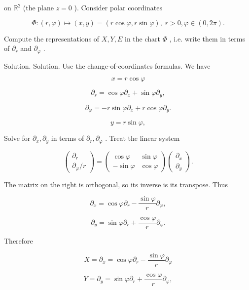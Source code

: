 \documentclass[10pt]{article}
\begin{document}
on \({\mathbb{R}}^{2}\) (the plane \(z = 0\) ). Consider polar coordinates

\[
\Phi  : \left( {r,\varphi }\right)  \mapsto  \left( {x,y}\right)  = \left( {r\cos \varphi ,r\sin \varphi }\right) ,\;r > 0,\varphi  \in  \left( {0,{2\pi }}\right) .
\]

Compute the representations of \(X,Y,E\) in the chart \(\Phi\) , i.e. write them in terms of \({\partial }_{r}\) and \({\partial }_{\varphi }\) .

Solution. Solution. Use the change-of-coordinates formulas. We have

\[
x = r\cos \varphi
\]

\[
{\partial }_{r} = \cos \varphi {\partial }_{x} + \sin \varphi {\partial }_{y},
\]

\[
{\partial }_{\varphi } =  - r\sin \varphi {\partial }_{x} + r\cos \varphi {\partial }_{y}.
\]

\[
y = r\sin \varphi ,
\]

Solve for \({\partial }_{x},{\partial }_{y}\) in terms of \({\partial }_{r},{\partial }_{\varphi }\) . Treat the linear system

\[
\left( \begin{matrix} {\partial }_{r} \\  {\partial }_{\varphi }/r \end{matrix}\right)  = \left( \begin{matrix} \cos \varphi & \sin \varphi \\   - \sin \varphi & \cos \varphi  \end{matrix}\right) \left( \begin{array}{l} {\partial }_{x} \\  {\partial }_{y} \end{array}\right) .
\]

The matrix on the right is orthogonal, so its inverse is its transpose. Thus

\[
{\partial }_{x} = \cos \varphi {\partial }_{r} - \frac{\sin \varphi }{r}{\partial }_{\varphi },
\]

\[
{\partial }_{y} = \sin \varphi {\partial }_{r} + \frac{\cos \varphi }{r}{\partial }_{\varphi }.
\]

Therefore

\[
X = {\partial }_{x} = \cos \varphi {\partial }_{r} - \frac{\sin \varphi }{r}{\partial }_{\varphi }
\]

\[
Y = {\partial }_{y} = \sin \varphi {\partial }_{r} + \frac{\cos \varphi }{r}{\partial }_{\varphi },
\]
\end{document}
